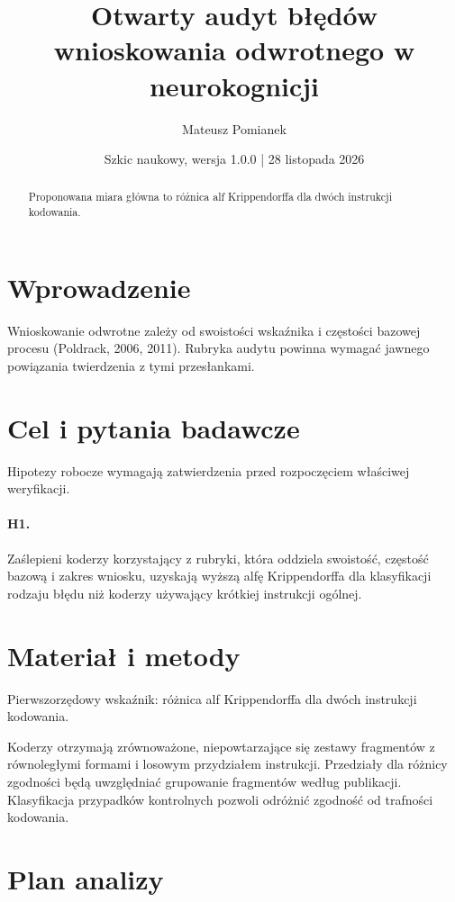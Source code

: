 \documentclass[11pt,a4paper]{article}
\title{Otwarty audyt błędów wnioskowania odwrotnego w neurokognicji}
\author{Mateusz Pomianek}
\date{Szkic naukowy, wersja 1.0.0 | 28 listopada 2026}
\begin{document}
\maketitle

\begin{abstract}

Proponowana miara główna to różnica alf Krippendorffa dla dwóch instrukcji kodowania.

\end{abstract}

\section{Wprowadzenie}

Wnioskowanie odwrotne zależy od swoistości wskaźnika i częstości bazowej procesu (Poldrack, 2006, 2011). Rubryka audytu powinna wymagać jawnego powiązania twierdzenia z tymi przesłankami.

\section{Cel i pytania badawcze}

Hipotezy robocze wymagają zatwierdzenia przed rozpoczęciem właściwej weryfikacji.

\paragraph{H1.} Zaślepieni koderzy korzystający z rubryki, która oddziela swoistość, częstość bazową i zakres wniosku, uzyskają wyższą alfę Krippendorffa dla klasyfikacji rodzaju błędu niż koderzy używający krótkiej instrukcji ogólnej.

\section{Materiał i metody}

Pierwszorzędowy wskaźnik: różnica alf Krippendorffa dla dwóch instrukcji kodowania.

Koderzy otrzymają zrównoważone, niepowtarzające się zestawy fragmentów z równoległymi formami i losowym przydziałem instrukcji. Przedziały dla różnicy zgodności będą uwzględniać grupowanie fragmentów według publikacji. Klasyfikacja przypadków kontrolnych pozwoli odróżnić zgodność od trafności kodowania.

\section{Plan analizy}
\end{document}
